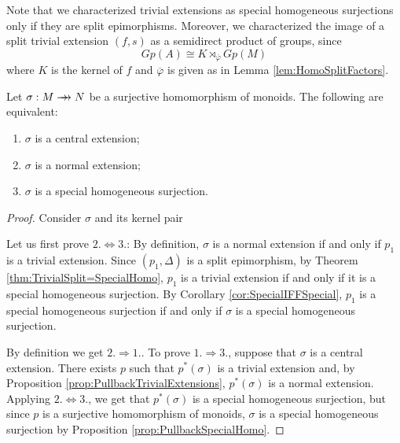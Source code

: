 \begin{oss*}
    Note that we characterized trivial extensions as special homogeneous surjections only if they are split epimorphisms. Moreover, we characterized the image of a split trivial extension $(f,s)$ as a semidirect product of groups, since 
    \[ Gp(A) \cong K\rtimes_{\overline{\varphi}} Gp(M) \]
    where $K$ is the kernel of $f$ and $\overline{\varphi}$ is given as in Lemma \ref{lem:HomoSplitFactors}. 
\end{oss*}

\begin{theorem}
\label{thm:Normal=SpecialHomo}
    Let $\sigma:M\rrightarrow N$ be a surjective homomorphism of monoids. The following are equivalent:
    \begin{enumerate}
        \item $\sigma$ is a central extension;
        \item $\sigma$ is a normal extension;
        \item $\sigma$ is a special homogeneous surjection.
    \end{enumerate}
    \begin{proof}
        Consider $\sigma$ and its kernel pair
        \begin{center}
        \end{center}
        Let us first prove $2.\iff 3.$: By definition, $\sigma$ is a normal extension if and only if $p_1$ is a trivial extension. Since $(p_1,\Delta)$ is a split epimorphism, by Theorem \ref{thm:TrivialSplit=SpecialHomo}, $p_1$ is a trivial extension if and only if it is a special homogeneous surjection. By Corollary \ref{cor:SpecialIFFSpecial}, $p_1$ is a special homogeneous surjection if and only if $\sigma$ is a special homogeneous surjection.
        
        By definition we get $2.\Rightarrow 1.$. To prove $1.\Rightarrow 3.$, suppose that $\sigma$ is a central extension. There exists $p$ such that $p^*(\sigma)$ is a trivial extension and, by Proposition \ref{prop:PullbackTrivialExtensions}, $p^*(\sigma)$ is a normal extension. Applying $2.\iff 3.$, we get that $p^*(\sigma)$ is a special homogeneous surjection, but since $p$ is a surjective homomorphism of monoids, $\sigma$ is a special homogeneous surjection by Proposition \ref{prop:PullbackSpecialHomo}.
    \end{proof}
\end{theorem}

